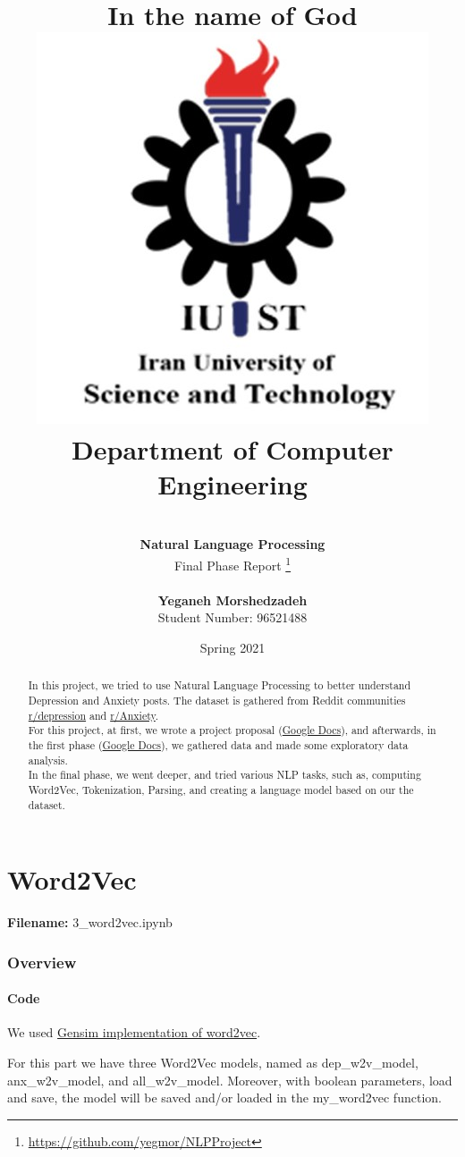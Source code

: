 \documentclass[12pt, a4paper]{article}
\title{
	{\Huge \textbf{In the name of God}}
	\\[20pt]
	\includegraphics[width=0.5\linewidth]{../assets/IUST_logo_color_eng.jpg} \\
	{\normalsize Department of Computer Engineering}
}
\author{
	\\[10pt]
	\textbf{{\LARGE Natural Language Processing}}
	\\[10pt]
	\LARGE Final Phase Report
	\thanks{\url{https://github.com/yegmor/NLPProject}}
	
	\\[30pt]
	\textbf{Yeganeh Morshedzadeh}
	\\[5pt]
	Student Number: 96521488
}
\date{Spring 2021}
\begin{document}
	
\maketitle
	
\clearpage
\tableofcontents
\newpage

\listoffigures
\newpage

\listoftables
\newpage

\begin{abstract}
	In this project, we tried to use Natural Language Processing to better understand Depression and Anxiety posts. The dataset is gathered from Reddit communities \href{https://www.reddit.com/r/depression}{r/depression} and \href{https://www.reddit.com/r/Anxiety}{r/Anxiety}.
	\\[10pt]
	
	For this project, at first, we wrote a project proposal (\href{https://docs.google.com/document/d/1tHGEmEgn8-sp8MD72d8NjnZsq-GpVupzsMWgnqaGi-Y/edit?usp=sharing}{Google Docs}), and afterwards, in the first phase (\href{https://docs.google.com/document/d/1Jc2ELhweU01Tbf0WalU7wVQABdAV4w50mhQnmMpU2mM/edit?usp=sharing}{Google Docs}), we gathered data and made some exploratory data analysis. 
	\\[10pt]
	
	In the final phase, we went deeper, and tried various NLP tasks, such as, computing Word2Vec, Tokenization, Parsing, and creating a language model based on our the dataset.
\end{abstract}

\newpage
\part{Word2Vec}
\large{\textbf{Filename:} 3\_word2vec.ipynb}
\section{Overview}

\subsection{Code}
We used \href{https://radimrehurek.com/gensim/models/word2vec.html}{Gensim implementation of word2vec}. 

For this part we have three Word2Vec models, named as dep\_w2v\_model, anx\_w2v\_model, and all\_w2v\_model. Moreover, with boolean parameters, load and save, the model will be saved and/or loaded in the my\_word2vec function.
\end{document}
